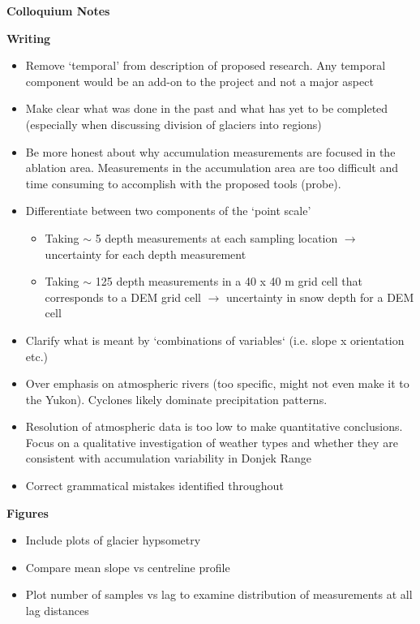 \documentclass[12pt]{article}
\begin{document}

\begin{center}
\Large \textbf{Colloquium Notes}
\end{center}



\noindent \textbf{Writing}
\begin{itemize}
\item Remove `temporal' from description of proposed research. Any temporal component would be an add-on to the project and not a major aspect
\item Make clear what was done in the past and what has yet to be completed (especially when discussing division of glaciers into regions)
\item Be more honest about why accumulation measurements are focused in the ablation area. Measurements in the accumulation area are too difficult and time consuming to accomplish with the proposed tools (probe). 
\item Differentiate between two components of the `point scale' 
\begin{itemize}
\item Taking $\sim$ 5 depth measurements at each sampling location $\rightarrow$ uncertainty for each depth measurement
\item Taking $\sim$ 125 depth measurements in a 40 x 40 m grid cell that corresponds to a DEM grid cell $\rightarrow$ uncertainty in snow depth for a DEM cell 
\end{itemize}
\item Clarify what is meant by `combinations of variables` (i.e. slope x orientation etc.)
\item Over emphasis on atmospheric rivers (too specific, might not even make it to the Yukon). Cyclones likely dominate precipitation patterns.
\item Resolution of atmospheric data is too low to make quantitative conclusions. Focus on a qualitative investigation of weather types and whether they are consistent with accumulation variability in Donjek Range
\item Correct grammatical mistakes identified throughout
\end{itemize}

\noindent \textbf{Figures}
\begin{itemize}
\item Include plots of glacier hypsometry
\item Compare mean slope vs centreline profile
\item Plot number of samples vs lag to examine distribution of measurements at all lag distances 
\end{itemize}
\end{document}
